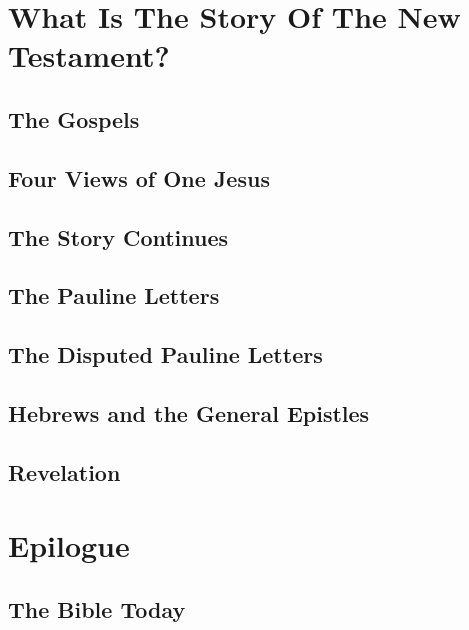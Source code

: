 \documentclass{report}
\begin{document}
\part{What Is The Story Of The New Testament?}

    \chapter{The Gospels}
    \chapter{Four Views of One Jesus}
    \chapter{The Story Continues}
    \chapter{The Pauline Letters}
    \chapter{The Disputed Pauline Letters}
    \chapter{Hebrews and the General Epistles}
    \chapter{Revelation}

\part{Epilogue}

    \chapter{The Bible Today}
\end{document}
